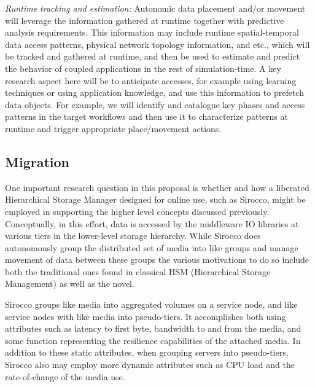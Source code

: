 {\em Runtime tracking and estimation:} Autonomic data placement and/or
movement will leverage the information gathered at runtime together with
predictive analysis requirements. This information may include runtime
spatial-temporal data access patterns, physical network topology
information, and etc., which will be tracked and gathered at runtime, and
then be used to estimate and predict the behavior of coupled applications in
the rest of simulation-time. A key research aspect here will be to
anticipate accesses, for example using learning techniques or using
application knowledge, and use this information to prefetch data objects.
For example, we will identify and catalogue key phases and access patterns
in the target workflows and then use it to characterize patterns at runtime
and trigger appropriate place/movement actions.

\subsection{Migration}

One important research question in this proposal is whether and how a liberated
Hierarchical Storage Manager designed for online use, such as Sirocco, might be
employed in supporting the higher level concepts discussed previously.
Conceptually, in this effort, data is accessed by the middleware IO libraries
at various tiers in the lower-level storage hierarchy. While Sirocco does
autonomously group the distributed set of media into like groups and manage
movement of data between these groups the various motivations to do so include
both the traditional ones found in classical HSM (Hierarchical Storage
Management) as well as the novel.

Sirocco groups like media into aggregated volumes on a service node, and like
service nodes with like media into pseudo-tiers. It accomplishes both using
attributes such as latency to first byte, bandwidth to and from the media, and
some function representing the resilience capabilities of the attached media.
In addition to these static attributes, when grouping servers into
pseudo-tiers, Sirocco also may employ more dynamic attributes such as CPU load
and the rate-of-change of the media use.

